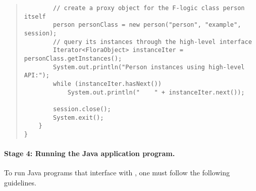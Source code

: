 \begin{quote}
\begin{verbatim}
        // create a proxy object for the F-logic class person itself
        person personClass = new person("person", "example", session);
        // query its instances through the high-level interface
        Iterator<FloraObject> instanceIter = personClass.getInstances();
        System.out.println("Person instances using high-level API:");
        while (instanceIter.hasNext())
            System.out.println("    " + instanceIter.next());
        
        session.close();
        System.exit();
    }
}
\end{verbatim}
\end{quote}

\paragraph{Stage 4: Running the Java application program.}
To run Java programs that interface with \FLORA, one must follow the
following guidelines.

